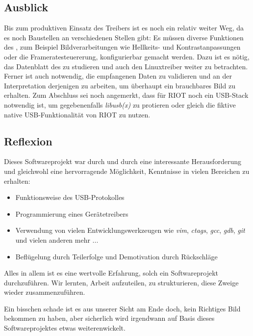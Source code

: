 \subsection{Ausblick}
Bis zum produktiven Einsatz des Treibers ist es noch ein relativ weiter Weg, da es noch Baustellen an verschiedenen Stellen gibt:
Es müssen diverse Funktionen des \saa, zum Beispiel Bildverarbeitungen wie Hellkeits- und Kontrastanpassungen oder die Frameratesteuererung, konfigurierbar gemacht werden.
Dazu ist es nötig, das Datenblatt des \saa{} zu studieren und auch den Linuxtreiber weiter zu betrachten.
Ferner ist auch notwendig, die empfangenen Daten zu validieren und an der Interpretation derjenigen zu arbeiten, um überhaupt ein brauchbares Bild zu erhalten.
Zum Abschluss sei noch angemerkt, dass für RIOT noch ein USB-Stack notwendig ist, um gegebenenfalls \emph{libusb(x)} zu protieren oder gleich die fiktive native USB-Funktionalität von RIOT zu nutzen.

\subsection{Reflexion}
Dieses Softwareprojekt war durch und durch eine interessante Herausforderung und gleichwohl eine hervorragende Möglichkeit, Kenntnisse in vielen Bereichen zu erhalten:
\begin{itemize}
 \item Funktionsweise des USB-Protokolles
 \item Programmierung eines Gerätetreibers
 \item Verwendung von vielen Entwicklungswerkzeugen wie \emph{vim}, \emph{ctags}, \emph{gcc}, \emph{gdb}, \emph{git} und vielen anderen mehr ...
 \item Beflügelung durch Teilerfolge und Demotivation durch Rückschläge
\end{itemize}
Alles in allem ist es eine wertvolle Erfahrung, solch ein Softwareprojekt durchzuführen.
Wir lernten, Arbeit aufzuteilen, zu strukturieren, diese Zweige wieder zusammenzuführen.

Ein bisschen schade ist es aus unserer Sicht am Ende doch, kein Richtiges Bild bekommen zu haben, aber sicherlich wird irgendwann auf Basis dieses Softwareprojektes etwas weiterenwickelt.
